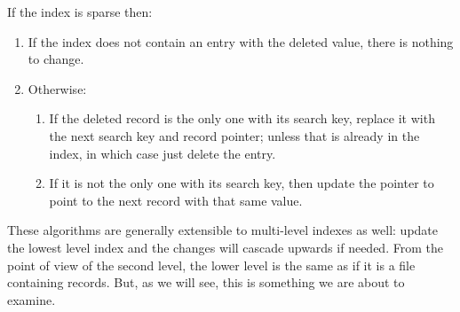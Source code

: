 If the index is sparse then:

\begin{enumerate}
	\item If the index does not contain an entry with the deleted value, there is nothing to change.
	\item Otherwise:
		\begin{enumerate}
			\item If the deleted record is the only one with its search key, replace it with the next search key and record pointer; unless that is already in the index, in which case just delete the entry.
			\item If it is not the only one with its search key, then update the pointer to point to the next record with that same value.
		\end{enumerate}
\end{enumerate}

These algorithms are generally extensible to multi-level indexes as well: update the lowest level index and the changes will cascade upwards if needed. From the point of view of the second level, the lower level is the same as if it is a file containing records. But, as we will see, this is something we are about to examine.





